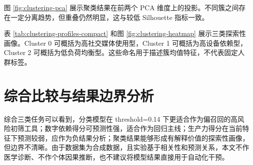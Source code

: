 
图 \ref{fig:clustering-pca} 展示聚类结果在前两个 PCA 维度上的投影。不同簇之间存在一定分离趋势，但重叠仍然明显，这与较低 Silhouette 指标一致。


表 \ref{tab:clustering-profiles-compact} 和图 \ref{fig:clustering-heatmap} 展示三类探索性画像。Cluster 0 可概括为高社交媒体使用型，Cluster 1 可概括为高设备依赖型，Cluster 2 可概括为低负荷均衡型。这些命名用于描述簇均值特征，不代表固定人群标签。




\section{综合比较与结果边界分析}

综合三类任务可以看到，分类模型在 threshold=0.14 下更适合作为偏召回的高风险初筛工具；数字依赖得分可预测性强，适合作为回归主线；生产力得分在当前特征下预测较弱，应作为负结果分析；聚类结果能够形成有解释价值的探索性画像，但边界不清晰。由于数据集为合成数据，且实验基于相关性和预测关系，本文不作医学诊断、不作个体因果推断，也不建议将模型结果直接用于自动化干预。
